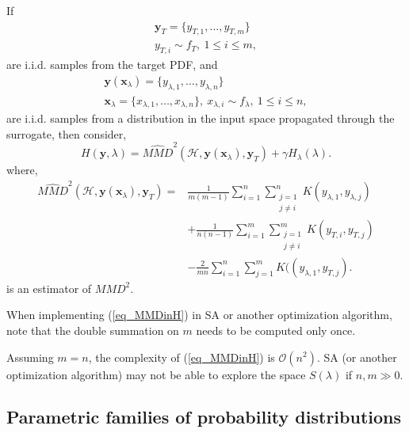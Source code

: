 If 
$$
 \begin{array}{c}
  \pmb{y}_T = \{y_{T,1}, \dots, y_{T,m}\} \\
  y_{T,i} \sim f_T, \ 1 \leq i \leq m,
 \end{array}
$$
are i.i.d. samples from the target PDF, and
$$
 \begin{array}{c}
  \pmb{y}(\pmb{x}_{\lambda}) = \{y_{\lambda,1}, \dots, y_{\lambda,n}\} \\
  \pmb{x}_{\lambda} = \{x_{\lambda,1}, \dots, x_{\lambda,n}\}, \ x_{\lambda,i} \sim f_\lambda, \ 1 \leq i \leq n,
 \end{array} 
$$
are i.i.d. samples from a distribution in the input space propagated through the surrogate, then consider,
$$
  H(\pmb{y},\lambda) = \widehat{MMD}^2(\mathcal{H},\pmb{y}(\pmb{x}_{\lambda}),\pmb{y}_T) + \gamma H_{\lambda}(\lambda).
$$ 
where,
\begin{equation} \label{eq_MMDinH}
 \begin{aligned}
  \widehat{MMD}^2(\mathcal{H},\pmb{y}(\pmb{x}_{\lambda}),\pmb{y}_T) = 
         &\frac{1}{m(m-1)} \sum_{i=1}^n \sum_{\substack{j=1 \\ j \neq i}}^n K(y_{\lambda,1},y_{\lambda,j}) \\
        &+ \frac{1}{n(n-1)} \sum_{i=1}^m \sum_{\substack{j=1 \\ j \neq i}}^m K(y_{T,i},y_{T,j}) \\
        &- \frac{2}{mn} \sum_{i=1}^n \sum_{j=1}^m K((y_{\lambda,1},y_{T,j}).  
 \end{aligned}
\end{equation} 
is an estimator of $MMD^2$.

\begin{remark}
  When implementing (\ref{eq_MMDinH}) in SA or another optimization algorithm, note that the double summation on $m$ needs to be computed only once.
\end{remark}

\begin{remark}
  Assuming $m = n$, the complexity of (\ref{eq_MMDinH}) is $\mathcal{O}(n^2)$. SA (or another optimization algorithm) may not be able to explore the space $S(\lambda)$ if $n ,m\gg 0$.
\end{remark}

\subsection{Parametric families of probability distributions} \label{sec_parametricFamilies}

